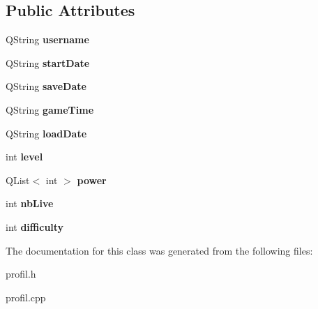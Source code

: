 \subsection*{Public Attributes}
\begin{DoxyCompactItemize}
\item 
\hypertarget{class_profil_a89a51837f12f3677bf066144f9d37e2f}{}Q\+String {\bfseries username}\label{class_profil_a89a51837f12f3677bf066144f9d37e2f}

\item 
\hypertarget{class_profil_a2889a1384cd384c59e4b2951fcb4867c}{}Q\+String {\bfseries start\+Date}\label{class_profil_a2889a1384cd384c59e4b2951fcb4867c}

\item 
\hypertarget{class_profil_a0c75387fbebb268dfbde16f6e57765b0}{}Q\+String {\bfseries save\+Date}\label{class_profil_a0c75387fbebb268dfbde16f6e57765b0}

\item 
\hypertarget{class_profil_a99010796e52e896f8c98362c5d1b7457}{}Q\+String {\bfseries game\+Time}\label{class_profil_a99010796e52e896f8c98362c5d1b7457}

\item 
\hypertarget{class_profil_a79712daf497e882bc5a915116b5a80b8}{}Q\+String {\bfseries load\+Date}\label{class_profil_a79712daf497e882bc5a915116b5a80b8}

\item 
\hypertarget{class_profil_afaa96616ab12811ed8cdc1bcff349193}{}int {\bfseries level}\label{class_profil_afaa96616ab12811ed8cdc1bcff349193}

\item 
\hypertarget{class_profil_a9c398ab8193c440a7e8b8cde66385a78}{}Q\+List$<$ int $>$ {\bfseries power}\label{class_profil_a9c398ab8193c440a7e8b8cde66385a78}

\item 
\hypertarget{class_profil_abcfe0990f019dcf34bf535c99e76113a}{}int {\bfseries nb\+Live}\label{class_profil_abcfe0990f019dcf34bf535c99e76113a}

\item 
\hypertarget{class_profil_afd73c0f18883202151bd7fddda5b55aa}{}int {\bfseries difficulty}\label{class_profil_afd73c0f18883202151bd7fddda5b55aa}

\end{DoxyCompactItemize}


The documentation for this class was generated from the following files\+:\begin{DoxyCompactItemize}
\item 
profil.\+h\item 
profil.\+cpp\end{DoxyCompactItemize}

